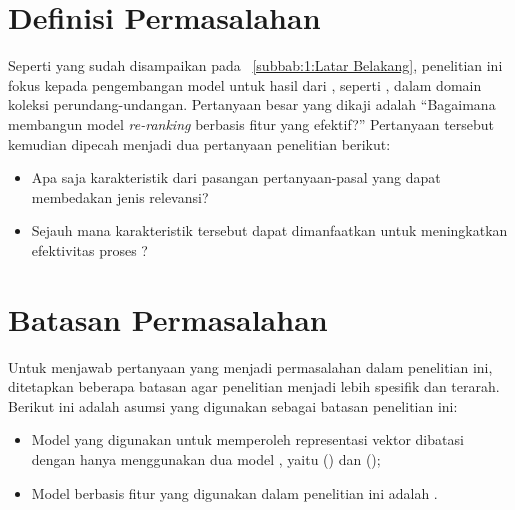 \section{Definisi Permasalahan}
\label{subbab:1:Definisi Permasalahan}
Seperti yang sudah disampaikan pada \subbab~\ref{subbab:1:Latar Belakang}, penelitian ini fokus kepada pengembangan model untuk \reranking{} hasil dari \sparse{} \retrieval{}, seperti \obm{}, dalam domain koleksi perundang-undangan. Pertanyaan besar yang dikaji adalah ``Bagaimana membangun model \textit{re-ranking} berbasis fitur yang efektif?'' Pertanyaan tersebut kemudian dipecah menjadi dua pertanyaan penelitian berikut:
\begin{itemize} [topsep=0pt, itemsep=-1ex, partopsep=1ex, parsep=1ex]
    \item Apa saja karakteristik dari pasangan pertanyaan-pasal yang dapat membedakan jenis relevansi?
    \item Sejauh mana karakteristik tersebut dapat dimanfaatkan untuk meningkatkan efektivitas proses \retrieval{}?
\end{itemize}





\section{Batasan Permasalahan}
\label{subbab:1:Batasan Permasalahan}
Untuk menjawab pertanyaan yang menjadi permasalahan dalam penelitian ini, ditetapkan beberapa batasan agar penelitian menjadi lebih spesifik dan terarah. Berikut ini adalah asumsi yang digunakan sebagai batasan penelitian ini:
\begin{itemize} [topsep=0pt, itemsep=-1ex, partopsep=1ex, parsep=1ex]
    \item Model yang digunakan untuk memperoleh representasi vektor dibatasi dengan hanya menggunakan dua model \transformer{}, yaitu \lbert{} (\bert{}) dan \ttttt{} (\tfive{});
    \item Model \reranker{} berbasis fitur yang digunakan dalam penelitian ini adalah \lambdamart{}.
\end{itemize}





